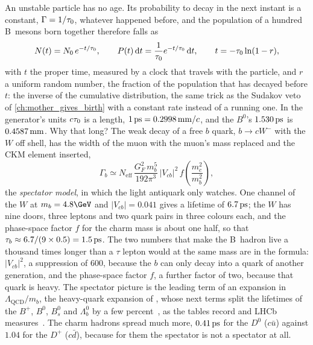 An unstable particle has no age. Its probability to decay in the next
instant is a constant, $\Gamma=1/\tau_0$, whatever happened before, and the
population of a hundred B~mesons born together therefore falls as
\begin{equation}
  N(t)=N_0\,e^{-t/\tau_0},\qquad
  P(t)\,\mathrm{d}t=\frac{1}{\tau_0}e^{-t/\tau_0}\,\mathrm{d}t,\qquad
    t=-\tau_0\ln(1-r),
  \label{eq:children_producing_grandchildren:decay_law}
\end{equation}
with $t$ the proper time, measured by a clock that travels with the
particle, and $r$ a uniform random number, the fraction of the population
that has decayed before $t$: the inverse of the cumulative distribution, the same trick as the Sudakov veto of
\cref{ch:mother_gives_birth} with a constant rate instead of a running
one. In the generator's units $c\tau_0$ is a length, $1\,\mathrm{ps}=0.2998\,\mathrm{mm}/c$,
and the $B^0$'s $1.530\,\mathrm{ps}$ is $0.4587\,\mathrm{mm}$. Why that long? The weak decay of
a free $b$ quark, $b\to cW^-$ with the $W$ off shell, has the width of the
muon with the muon's mass replaced and the CKM element inserted,
\begin{equation}
  \Gamma_b\simeq N_{\mathrm{eff}}\,\frac{G_F^2\,m_b^5}{192\pi^3}\,|V_{cb}|^2\,f\!\left(\frac{m_c^2}{m_b^2}\right),
  \label{eq:children_producing_grandchildren:spectator}
\end{equation}
the \emph{spectator model}, in which the light antiquark only watches.
One channel of the $W$ at $m_b=4.8\GeV$ and $|V_{cb}|=0.041$ gives a
lifetime of $6.7\,\mathrm{ps}$; the $W$ has nine doors, three leptons and two quark
pairs in three colours each, and the phase-space factor $f$ for the charm
mass is about one half, so that $\tau_b\approx6.7/(9\times0.5)=1.5\,\mathrm{ps}$.
The two numbers that make the B~hadron live a thousand times longer than
a $\tau$ lepton would at the same mass are in the formula: $|V_{cb}|^2$,
a suppression of $600$, because the $b$ can only decay into a quark of
another generation, and the phase-space factor $f$, a further factor of
two, because that quark is heavy. The spectator picture is the leading term of an expansion in
$\Lambda_{\mathrm{QCD}}/m_b$, the heavy-quark expansion of
\cite{Bigi:1992su,Manohar:1993qn,Neubert:1993mb}, whose next terms split
the lifetimes of the $B^+$, $B^0$, $B_s^0$ and $\Lambda_b^0$ by a few
percent~\cite{Neubert:1996we,Lenz:2014jha,Lenz:2022rbq}, as the tables
record and LHCb measures~\cite{LHCb:2014qsd}. The charm hadrons spread
much more, $0.41\,\mathrm{ps}$ for the $D^0$ ($c\bar u$) against $1.04$ for the
$D^+$ ($c\bar d$), because for them the spectator is not a spectator at
all.


